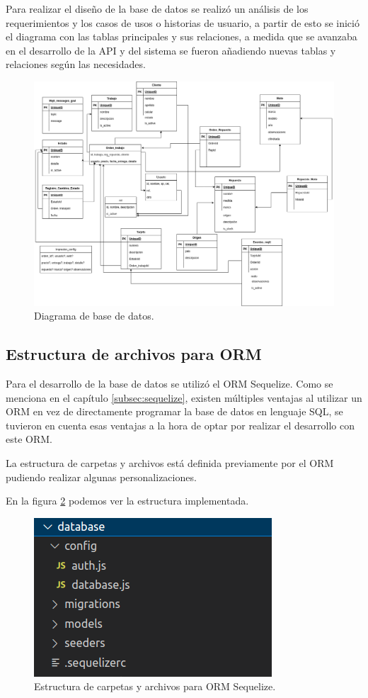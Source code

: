 Para realizar el diseño de la base de datos se realizó un análisis de los requerimientos y los casos de usos o historias de usuario, a partir de esto se inició el diagrama con las tablas principales y sus relaciones, a medida que se avanzaba en el desarrollo de la API y del sistema  se fueron añadiendo nuevas tablas y relaciones según las necesidades. 

\begin{figure}[h]
	\centering
	\includegraphics[scale=.27]{./Figures/diagramabbdd.png}
	\caption{Diagrama de base de datos.}
	\label{fig:diagramabbdd}
\end{figure}

\subsection{Estructura de archivos para ORM}
\label{subsec:estructuraorm}
Para el desarrollo de la base de datos se utilizó el ORM Sequelize. Como se menciona en el capítulo \ref{subsec:sequelize}, existen múltiples ventajas al utilizar un ORM en vez de directamente programar la base de datos en lenguaje SQL, se tuvieron en cuenta esas ventajas a la hora de optar por realizar el desarrollo con este ORM. 

La estructura de carpetas y archivos está definida previamente por el ORM pudiendo realizar algunas personalizaciones. 

En la figura \ref{fig:estructuraorm} podemos ver la estructura implementada.

\begin{figure}[h]
	\centering
	\includegraphics[scale=.50]{./Figures/estructuraorm.png}
	\caption{Estructura de carpetas y archivos para ORM Sequelize.}
	\label{fig:estructuraorm}
\end{figure}

